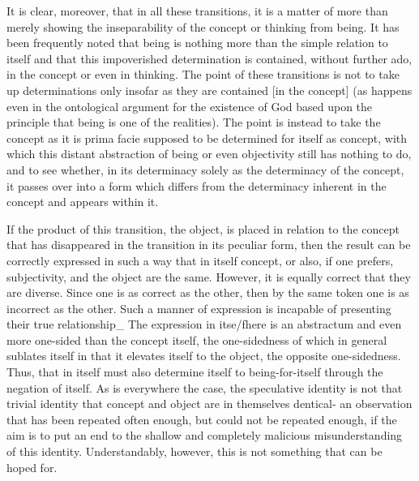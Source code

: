 It is clear, moreover, that in all these transitions, it is a matter
of more than merely showing the inseparability of the concept or
thinking from being. It has been frequently noted that being is
nothing more than the simple relation to itself and that this
impoverished determination is contained, without further ado, in
the concept or even in thinking. The point of these transitions is not
to take up determinations only insofar as they are contained [in the
concept] (as happens even in the ontological argument for the
existence of God based upon the principle that being is one of the
realities). The point is instead to take the concept as it is prima facie
supposed to be determined for itself as concept, with which this
distant abstraction of being or even objectivity still has nothing to
do, and to see whether, in its determinacy solely as the determinacy
of the concept, it passes over into a form which differs from the
determinacy inherent in the concept and appears within it.

If the product of this transition, the object, is placed in relation to
the concept that has disappeared in the transition in its peculiar
form, then the result can be correctly expressed in such a way that in
itself concept, or also, if one prefers, subjectivity, and the object are
the same. However, it is equally correct that they are diverse. Since one
is as correct as the other, then by the same token one is as incorrect
as the other. Such a manner of expression is incapable of presenting
their true relationship_ The expression in itse/fhere is an abstractum
and even more one-sided than the concept itself, the one-sidedness
of which in general sublates itself in that it elevates
itself to the object, the opposite one-sidedness.
Thus, that in itself must also determine itself to being-for-itself through the
negation of itself.
As is everywhere the case, the speculative identity is
not that trivial identity that concept and object are in themselves
dentical- an observation that has been repeated often enough, but
could not be repeated enough, if the aim is to put an end to the
shallow and completely malicious misunderstanding of this identity.
Understandably, however, this is not something that can be hoped for.

